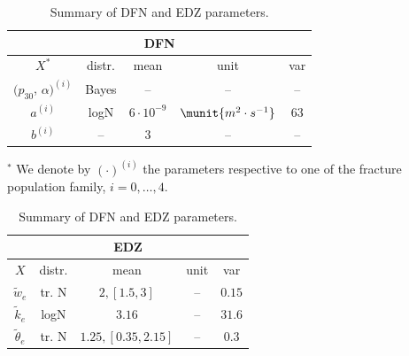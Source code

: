 \begin{table}[ht]
    \caption{Summary of DFN and EDZ parameters.}
    \label{tab:param_dfn_edz}
    \hfill
    \begin{minipage}[t]{0.45\textwidth}
        \centering
        \footnotesize
        \renewcommand{\arraystretch}{1.25}
        \begin{tabular}{ccccc}
        \toprule
        \multicolumn{5}{c}{DFN} \\
        \toprule
        $X^*$ & distr. & mean & unit & var \\
        \midrule
        $(p_{30}$, $\alpha)^{(i)}$ & Bayes & -- & -- & -- \\
        $a^{(i)}$ & logN & $6\cdot10^{-9}$& $\munit{m^2\cdot s^{-1}}$ & $63$ \\  
        
        
        
        $b^{(i)}$ & -- & $3$ & -- & -- \\
        \bottomrule
        \end{tabular}
        $^*$ We denote by $(\cdot)^{(i)}$ the parameters respective to one of the fracture population family, $i=0,\ldots,4$.
    \end{minipage}
    \hspace{2em}
    \begin{minipage}[t]{0.45\textwidth}
        \centering
        \footnotesize
        \renewcommand{\arraystretch}{1.25}
        \begin{tabular}{ccccc}
        \toprule
        \multicolumn{5}{c}{EDZ} \\
        \toprule
        $X$ & distr. & mean & unit & var \\
        \midrule
        \(\tilde{w}_e\) & tr. N & $2, [1.5,3]$ & -- & $0.15$ \\
        \(\tilde k_e\) & logN & $3.16$ & -- & $31.6$ \\
        \(\tilde \theta_e\) & tr. N & $1.25, [0.35,2.15]$ & -- & $0.3$ \\
        \bottomrule
        \end{tabular}
    \end{minipage}
    \hfill
\end{table}

